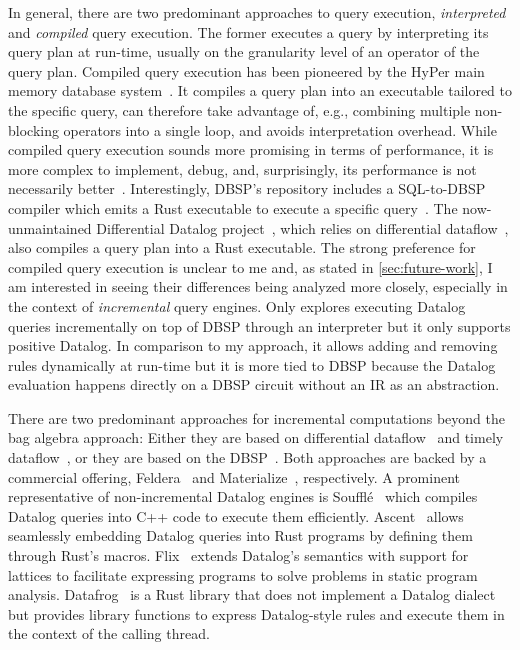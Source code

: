 In general, there are two predominant approaches to query execution,
\emph{interpreted} and \emph{compiled} query execution.
The former executes a query by interpreting its query plan at run-time,
usually on the granularity level of an operator of the query plan.
Compiled query execution has been pioneered by the HyPer main memory database
system~\cite{neumann2011efficiently}.
It compiles a query plan into an executable tailored to the specific query,
can therefore take advantage of, e.g., combining multiple non-blocking operators
into a single loop, and avoids interpretation overhead.
While compiled query execution sounds more promising in terms of performance,
it is more complex to implement, debug, and, surprisingly, its performance
is not necessarily better~\cite{kersten2018everything}.
Interestingly, DBSP's repository includes a SQL-to-DBSP compiler which emits
a Rust executable to execute a specific query~\cite{felderarepo}.
The now-unmaintained Differential Datalog project~\cite{ddlog, ddlogpaper},
which relies on differential dataflow~\cite{mcsherry2013differential},
also compiles a query plan into a Rust executable.
The strong preference for compiled query execution is unclear to me and,
as stated in \ref{sec:future-work}, I am interested in seeing their differences
being analyzed more closely, especially in the context of \emph{incremental}
query engines.
Only \cite{dynamicdatalog} explores executing Datalog queries incrementally
on top of DBSP through an interpreter but it only supports positive Datalog.
In comparison to my approach, it allows adding and removing rules dynamically
at run-time but it is more tied to DBSP because the Datalog evaluation happens
directly on a DBSP circuit without an \ac{IR} as an abstraction.

There are two predominant approaches for incremental computations beyond
the bag algebra approach:
Either they are based on differential dataflow~\cite{mcsherry2013differential}
and timely dataflow~\cite{timelydataflow}, or they are based on
the DBSP~\cite{budiu2024dbsp, budiu2025dbsp}.
Both approaches are backed by a commercial offering,
Feldera~\cite{felderainc} and Materialize~\cite{materializeinc}, respectively.
A prominent representative of non-incremental Datalog engines is
Soufflé~\cite{souffle} which compiles Datalog queries into C++ code to execute
them efficiently.
Ascent~\cite{ascent} allows seamlessly embedding Datalog queries into Rust
programs by defining them through Rust's macros.
Flix~\cite{flix} extends Datalog's semantics with support for lattices to
facilitate expressing programs to solve problems in static program analysis.
Datafrog~\cite{datafrog} is a Rust library that does not implement a Datalog
dialect but provides library functions to express Datalog-style rules and
execute them in the context of the calling thread.
